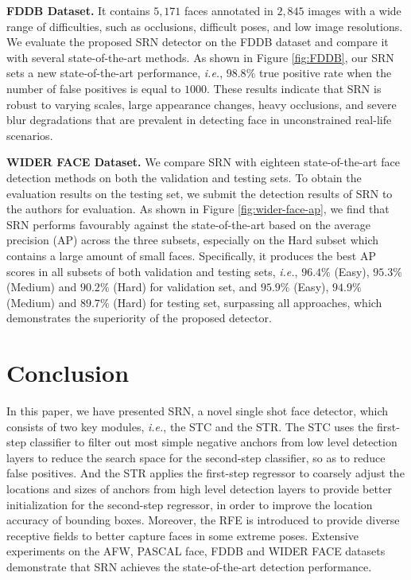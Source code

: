 \documentclass[letterpaper]{article} \usepackage{aaai19m}  \usepackage{times}  \usepackage{helvet}  \usepackage{courier}  \usepackage{url}  \usepackage{graphicx}  \usepackage{subfigure}
\def\ie{{\em i.e.}}
\begin{document}
{\flushleft \textbf{FDDB Dataset.} }
It contains $5,171$ faces annotated in $2,845$ images with a wide range of difficulties, such as occlusions, difficult poses, and low image resolutions. We evaluate the proposed SRN detector on the FDDB dataset and compare it with several state-of-the-art methods. As shown in Figure \ref{fig:FDDB}, our SRN sets a new state-of-the-art performance, \ie, $98.8\%$ true positive rate when the number of false positives is equal to $1000$. These results indicate that SRN is robust to varying scales, large appearance changes, heavy occlusions, and severe blur degradations that are prevalent in detecting face in unconstrained real-life scenarios.


{\flushleft \textbf{WIDER FACE Dataset.} }
We compare SRN with eighteen state-of-the-art face detection methods on both the validation and testing sets. To obtain the evaluation results on the testing set, we submit the detection results of SRN to the authors for evaluation. As shown in Figure \ref{fig:wider-face-ap}, we find that SRN performs favourably against the state-of-the-art based on the average precision (AP) across the three subsets, especially on the Hard subset which contains a large amount of small faces. Specifically, it produces the best AP scores in all subsets of both validation and testing sets, \ie, $96.4\%$ (Easy), $95.3\%$ (Medium) and $90.2\%$ (Hard) for validation set, and $95.9\%$ (Easy), $94.9\%$ (Medium) and $89.7\%$ (Hard) for testing set, surpassing all approaches, which demonstrates the superiority of the proposed detector.

\section{Conclusion}
In this paper, we have presented SRN, a novel single shot face detector, which consists of two key modules, \ie, the STC and the STR. The STC uses the first-step classifier to filter out most simple negative anchors from low level detection layers to reduce the search space for the second-step classifier, so as to reduce false positives. And the STR applies the first-step regressor to coarsely adjust the locations and sizes of anchors from high level detection layers to provide better initialization for the second-step regressor, in order to improve the location accuracy of bounding boxes. Moreover, the RFE is introduced to provide diverse receptive fields to better capture faces in some extreme poses. Extensive experiments on the AFW, PASCAL face, FDDB and WIDER FACE datasets demonstrate that SRN achieves the state-of-the-art detection performance.

\clearpage
\small


\end{document}
